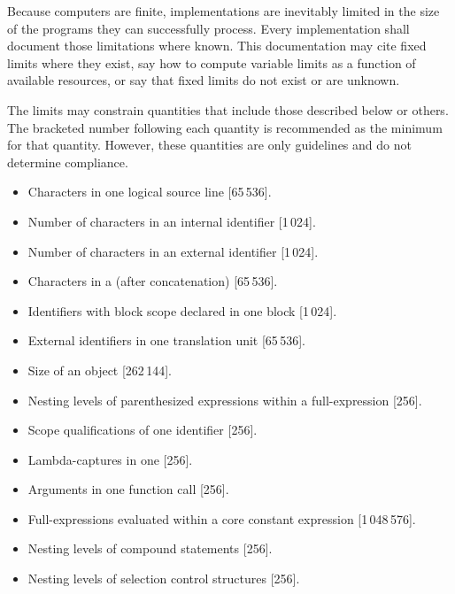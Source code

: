 
\pnum
Because computers are finite, \Cpp{}  implementations are inevitably
limited in the size of the programs they can successfully process.
Every implementation shall
document those limitations where known.
This documentation may cite fixed limits where they
exist, say how to compute variable limits as a function
of available resources, or say that fixed limits do not exist
or are unknown.

\pnum
The limits may constrain quantities
that include those described below or others.
The bracketed number following each quantity is recommended
as the minimum for that quantity.
However, these quantities are only guidelines and do not determine compliance.
\begin{itemize}
\item%
Characters in one logical source line [65\,536].
\item%
Number of characters in an internal identifier [1\,024].
\item%
Number of
characters in an external identifier [1\,024].
\item%
Characters in a 
(after concatenation) [65\,536].
\item%
Identifiers with block scope declared in one block [1\,024].
\item%
External identifiers in one translation unit [65\,536].
\item%
Size of an object [262\,144].
\item%
Nesting levels of parenthesized expressions within a full-expression [256].
\item%
Scope qualifications of one identifier [256].
\item%
Lambda-captures in one  [256].
\item%
Arguments in one function call [256].
\item%
Full-expressions evaluated within a core constant expression [1\,048\,576].
\item%
Nesting levels of compound statements [256].
\item%
Nesting levels of selection control structures [256].

\end{itemize}
